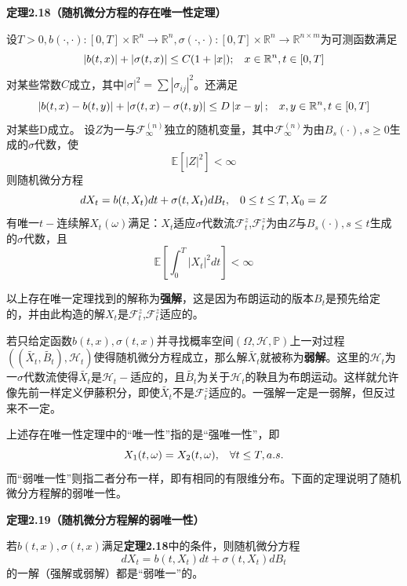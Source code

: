 \documentclass[UTF8，12pt]{ctexart}
\numberwithin{equation}{section}
\begin{document}
\vspace{0.3cm}
\noindent \textbf{定理2.18（随机微分方程的存在唯一性定理）}

设$T>0,b(\cdot,\cdot):[0,T]\times\mathbb{R}^n\to\mathbb{R}^n,\sigma(\cdot,\cdot):[0,T]\times\mathbb{R}^n\to\mathbb{R}^{n\times m}$为可测函数满足
\[
\left\vert b(t,x)\right\vert+\left\vert \sigma(t,x)\right\vert\le C(1+\left\vert x\right\vert);\hspace{0.3cm}x\in\mathbb{R}^n,t\in[0,T]
\]
对某些常数$C$成立，其中$\left\vert\sigma\right\vert^2=\sum\left\vert\sigma_{ij}\right\vert^2$。还满足
\[
\left\vert b(t,x)-b(t,y)\right\vert+\left\vert \sigma(t,x)-\sigma(t,y)\right\vert\le D\left\vert x-y\right\vert;\hspace{0.3cm}x,y\in\mathbb{R}^n,t\in[0,T]
\]
对某些D成立。
设$Z$为一与$\mathcal{F}_{\infty}^{(n)}$独立的随机变量，其中$\mathcal{F}_{\infty}^{(n)}$为由$B_s(\cdot),s\ge 0$生成的$\sigma$代数，使
\[
\mathbb{E}[\left\vert Z\right\vert^2]<\infty
\]
则随机微分方程
\[
dX_t=b(t,X_t)dt+\sigma(t,X_t)dB_t,\hspace{0.3cm}0\le t\le T,X_0=Z
\]
有唯一$t-$连续解$X_t(\omega)$满足：$X_t$适应$\sigma$代数流$\mathcal{F}_t^z$,$\mathcal{F}_t^z$为由$Z$与$B_s(\cdot),s\le t$生成的$\sigma$代数，且
\[
\mathbb{E}\left[\int_{0}^{T}\left\vert X_t\right\vert^2dt\right]<\infty
\]

以上存在唯一定理找到的解称为\textbf{强解}，这是因为布朗运动的版本$B_t$是预先给定的，并由此构造的解$X_t$是$\mathcal{F}_t^z$,$\mathcal{F}_t^z$适应的。

若只给定函数$b(t,x),\sigma(t,x)$并寻找概率空间$(\Omega,\mathcal{H},\mathbb{P})$上一对过程$((\widetilde{X_t},\widetilde{B_t}),\mathcal{H}_t)$使得随机微分方程成立，那么解$\widetilde{X_t}$就被称为\textbf{弱解}。这里的$\mathcal{H}_t$为一$\sigma$代数流使得$\widetilde{X_t}$是$\mathcal{H}_t-$适应的，且$\widetilde{B_t}$为关于$\mathcal{H}_t$的鞅且为布朗运动。这样就允许像先前一样定义伊藤积分，即使$\widetilde{X_t}$不是$\mathcal{F}_t^z$适应的。一强解一定是一弱解，但反过来不一定。

上述存在唯一性定理中的“唯一性”指的是“强唯一性”，即
\[
X_1(t,\omega)=X_2(t,\omega),\hspace{0.3cm}\forall t\le T,a.s.
\]
而“弱唯一性”则指二者分布一样，即有相同的有限维分布。下面的定理说明了随机微分方程解的弱唯一性。

\vspace{0.3cm}
\noindent \textbf{定理2.19（随机微分方程解的弱唯一性）}

若$b(t,x),\sigma(t,x)$满足\textbf{定理2.18}中的条件，则随机微分方程
\[
dX_t=b(t,X_t)dt+\sigma(t,X_t)dB_t
\]
的一解（强解或弱解）都是“弱唯一”的。
\end{document}
